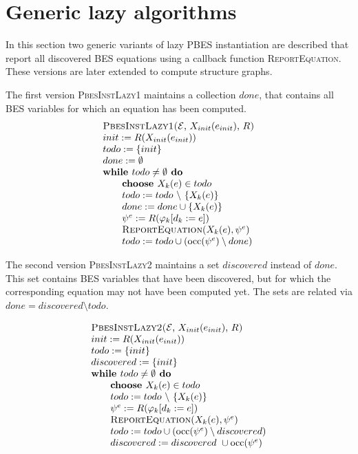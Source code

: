 \documentclass{article}
\newcommand{\Do}{\text{\textbf{ do }}}
\newcommand{\While}{\text{\textbf{while }}}
\newcommand{\Choose}{\text{\textbf{choose }}}
\begin{document}
\section{Generic lazy algorithms}

In this section two generic variants of lazy PBES instantiation are
described that report all discovered BES equations using a callback
function \textsc{ReportEquation}. These versions are later extended to compute
structure graphs.

The first version \textsc{PbesInstLazy1}
maintains a collection $done$, that contains all BES variables for
which an equation has been computed.%
\begin{equation*}
\begin{array}{l}
\text{\textsc{PbesInstLazy1(}}\mathcal{E}\text{, }X_{init}(e_{init})\text{, }%
R\text{\textsc{)}} \\
init:=R(X_{init}(e_{init})) \\
todo:=\{init\} \\
done:=\emptyset \\
\While todo\neq \emptyset \Do \\
\qquad \Choose X_{k}(e)\in todo \\
\qquad todo:=todo\ \backslash \ \{X_{k}(e)\} \\
\qquad done:=done\cup \{X_{k}(e)\} \\
\qquad \psi ^{e}:=R(\varphi _{k}[d_{k}:=e]) \\
\qquad \text{\textsc{ReportEquation}}(X_{k}(e),\psi ^{e}) \\
\qquad todo:=todo\cup (\mathrm{occ}(\psi ^{e})\setminus done)
\end{array}
\end{equation*}

The second version \textsc{PbesInstLazy2} maintains a set $discovered$
instead of $done$. This set contains BES
variables that have been discovered, but for which the corresponding
equation may not have been computed yet. The sets are related via
$done = discovered \setminus todo$.

\begin{equation*}
\begin{array}{l}
\text{\textsc{PbesInstLazy2(}}\mathcal{E}\text{, }X_{init}(e_{init})\text{, } R\text{\textsc{)}} \\
init:=R(X_{init}(e_{init})) \\
todo:=\{init\} \\
discovered:=\{init\} \\
\While todo\neq \emptyset \Do \\
\qquad \Choose X_{k}(e)\in todo \\
\qquad todo:=todo\ \backslash \ \{X_{k}(e)\} \\
\qquad \psi ^{e}:=R(\varphi _{k}[d_{k}:=e]) \\
\qquad \text{\textsc{ReportEquation}}(X_{k}(e),\psi ^{e}) \\
\qquad todo:=todo\cup (\mathrm{occ}(\psi ^{e})\setminus discovered) \\
\qquad discovered:=discovered\ \cup \mathrm{occ}(\psi ^{e})
\end{array}
\end{equation*}
\end{document}
